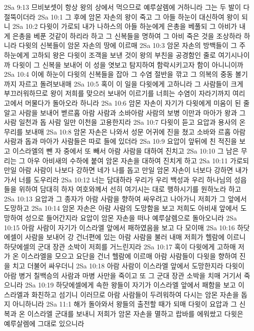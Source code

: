 2Sa 9:13  므비보셋이 항상 왕의 상에서 먹으므로 예루살렘에 거하니라 그는 두 발이 다 절뚝이더라
2Sa 10:1  그 후에 암몬 자손의 왕이 죽고 그 아들 하눈이 대신하여 왕이 되니
2Sa 10:2  다윗이 가로되 내가 나하스의 아들 하눈에게 은총을 베풀되 그 아비가 내게 은총을 베푼 것같이 하리라 하고 그 신복들을 명하여 그 아비 죽은 것을 조상하라 하니라 다윗의 신복들이 암몬 자손의 땅에 이르매
2Sa 10:3  암몬 자손의 방백들이 그 주 하눈에게 고하되 왕은 다윗이 조객을 보낸 것이 왕의 부친을 공경함인 줄로 여기시나이까 다윗이 그 신복을 보내어 이 성을 엿보고 탐지하여 함락시키고자 함이 아니니이까
2Sa 10:4  이에 하눈이 다윗의 신복들을 잡아 그 수염 절반을 깎고 그 의복의 중동 볼기까지 자르고 돌려보내매
2Sa 10:5  혹이 이 일을 다윗에게 고하니라 그 사람들이 크게 부끄러워하므로 왕이 저희를 맞으러 보내어 이르기를 너희는 수염이 자라기까지 여리고에서 머물다가 돌아오라 하니라
2Sa 10:6  암몬 자손이 자기가 다윗에게 미움이 된 줄 알고 사람을 보내어 벧르홉 아람 사람과 소바아람 사람의 보병 이만과 마아가 왕과 그 사람 일천과 돕 사람 일만 이천을 고용한지라
2Sa 10:7  다윗이 듣고 요압과 용사의 온 무리를 보내매
2Sa 10:8  암몬 자손은 나와서 성문 어귀에 진을 쳤고 소바와 르홉 아람 사람과 돕과 마아가 사람들은 따로 들에 있더라
2Sa 10:9  요압이 앞뒤에 친 적진을 보고 이스라엘의 뺀 자 중에서 또 빼서 아람 사람을 대하여 진치고
2Sa 10:10  그 남은 무리는 그 아우 아비새의 수하에 붙여 암몬 자손을 대하여 진치게 하고
2Sa 10:11  가로되 만일 아람 사람이 나보다 강하면 네가 나를 돕고 만일 암몬 자손이 너보다 강하면 내가 가서 너를 도우리라
2Sa 10:12  너는 담대하라 우리가 우리 백성과 우리 하나님의 성읍들을 위하여 담대히 하자 여호와께서 선히 여기시는 대로 행하시기를 원하노라 하고
2Sa 10:13  요압과 그 종자가 아람 사람을 향하여 싸우려고 나아가니 저희가 그 앞에서 도망하고
2Sa 10:14  암몬 자손은 아람 사람의 도망함을 보고 저희도 아비새 앞에서 도망하여 성으로 들어간지라 요압이 암몬 자손을 떠나 예루살렘으로 돌아오니라
2Sa 10:15  아람 사람이 자기가 이스라엘 앞에서 패하였음을 보고 다 모이매
2Sa 10:16  하닷에셀이 사람을 보내어 강 건너편에 있는 아람 사람을 불러 내매 저희가 헬람에 이르니 하닷에셀의 군대 장관 소박이 저희를 거느린지라
2Sa 10:17  혹이 다윗에게 고하매 저가 온 이스라엘을 모으고 요단을 건너 헬람에 이르매 아람 사람들이 다윗을 향하여 진을 치고 더불어 싸우더니
2Sa 10:18  아람 사람이 이스라엘 앞에서 도망한지라 다윗이 아람 병거 칠백승의 사람과 마병 사만을 죽이고 또 그 군대 장관 소박을 치매 거기서 죽으니라
2Sa 10:19  하닷에셀에게 속한 왕들이 자기가 이스라엘 앞에서 패함을 보고 이스라엘과 화친하고 섬기니 이러므로 아람 사람들이 두려워하여 다시는 암몬 자손을 돕지 아니하니라
2Sa 11:1  해가 돌아와서 왕들의 출전할 때가 되매 다윗이 요압과 그 신복과 온 이스라엘 군대를 보내니 저희가 암몬 자손을 멸하고 랍바를 에워쌌고 다윗은 예루살렘에 그대로 있으니라
